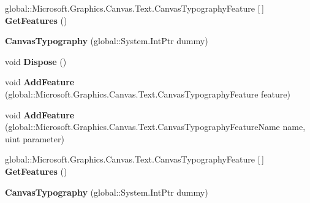 \begin{DoxyCompactItemize}
global\+::\+Microsoft.\+Graphics.\+Canvas.\+Text.\+Canvas\+Typography\+Feature \mbox{[}$\,$\mbox{]} {\bfseries Get\+Features} ()
\item 
\mbox{\label{class_microsoft_1_1_graphics_1_1_canvas_1_1_text_1_1_canvas_typography_acfaa49a5331916c8f6730fa502fc9485}} 
{\bfseries Canvas\+Typography} (global\+::\+System.\+Int\+Ptr dummy)
\item 
\mbox{\label{class_microsoft_1_1_graphics_1_1_canvas_1_1_text_1_1_canvas_typography_a1797ea53a1672e4abdf3ca14d7a3d8da}} 
void {\bfseries Dispose} ()
\item 
\mbox{\label{class_microsoft_1_1_graphics_1_1_canvas_1_1_text_1_1_canvas_typography_adb24235074d7ba03317c093ee442f78d}} 
void {\bfseries Add\+Feature} (global\+::\+Microsoft.\+Graphics.\+Canvas.\+Text.\+Canvas\+Typography\+Feature feature)
\item 
\mbox{\label{class_microsoft_1_1_graphics_1_1_canvas_1_1_text_1_1_canvas_typography_ad4ae4dcdbdf7c24abf69746742cc3d0c}} 
void {\bfseries Add\+Feature} (global\+::\+Microsoft.\+Graphics.\+Canvas.\+Text.\+Canvas\+Typography\+Feature\+Name name, uint parameter)
\item 
\mbox{\label{class_microsoft_1_1_graphics_1_1_canvas_1_1_text_1_1_canvas_typography_a91ad523c9e09574205511271e56e706b}} 
global\+::\+Microsoft.\+Graphics.\+Canvas.\+Text.\+Canvas\+Typography\+Feature \mbox{[}$\,$\mbox{]} {\bfseries Get\+Features} ()
\item 
\mbox{\label{class_microsoft_1_1_graphics_1_1_canvas_1_1_text_1_1_canvas_typography_acfaa49a5331916c8f6730fa502fc9485}} 
{\bfseries Canvas\+Typography} (global\+::\+System.\+Int\+Ptr dummy)
\item 
\mbox{\label{class_microsoft_1_1_graphics_1_1_canvas_1_1_text_1_1_canvas_typography_a1797ea53a1672e4abdf3ca14d7a3d8da}} 

\end{DoxyCompactItemize}
